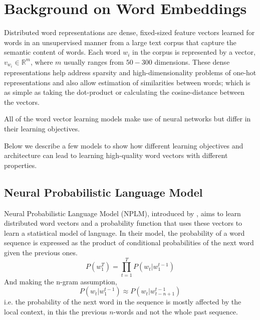 \section{Background on Word Embeddings}
\label{sec:background_distributed}
Distributed word representations are dense, fixed-sized feature vectors 
learned for words in an unsupervised manner from a large text corpus 
that capture the semantic content of words. Each word $w_{i}$ in the 
corpus is represented by a vector, $v_{w_{i}} \in \mathbb{R}^{m}$, 
where $m$ usually ranges from $50-300$ dimensions. These dense 
representations help address sparsity and high-dimensionality problems 
of one-hot representations and also allow estimation of
similarities between words; which is as simple as taking the dot-product 
or calculating the cosine-distance between the vectors. 

All of the word vector learning models make use of neural networks 
\citep{bengio2003neural, mnih2013learning, mikolov2013distributed, collobert2011natural, bottou2014machine, turian2010word, levy2014dependencybased} but differ in their learning objectives. 

Below we describe a few models to show how different learning objectives and architecture can lead to learning high-quality word vectors with different properties.

\subsection{Neural Probabilistic Language Model}
\label{sec:bengio}
Neural Probabilistic Language Model (NPLM), introduced by 
\citet{bengio2003neural}, aims to learn distributed word vectors and a 
probability function that uses these vectors to learn a statistical 
model of language. In their model, the probability of a word sequence 
is expressed as the product of conditional probabilities of the next 
word given the previous ones. 
\begin{equation}
P(w_{1}^{T}) =  \prod_{t=1}^{T} P(w_{t}| w_{1}^{t-1})
\end{equation}
And making the n-gram assumption, 
\begin{equation}
P(w_{t} | w_{1}^{t-1}) \approx P(w_{t} | w_{t-n+1}^{t-1})
\end{equation}
i.e. the probability of the next word in the sequence is mostly affected by the local context, in this the previous $n$-words and not the whole past sequence.

